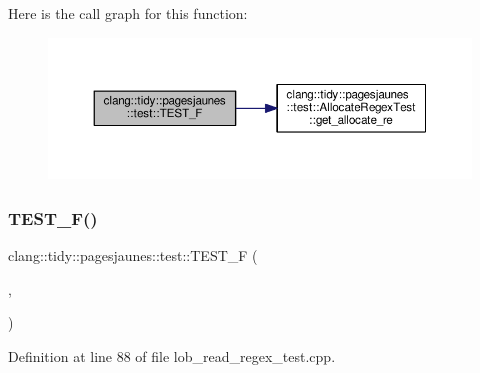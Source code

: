 Here is the call graph for this function\+:
\nopagebreak
\begin{figure}[H]
\begin{center}
\leavevmode
\includegraphics[width=350pt]{namespaceclang_1_1tidy_1_1pagesjaunes_1_1test_a4940df4810156915d9d7f59f88f92ec7_cgraph}
\end{center}
\end{figure}
\mbox{\label{namespaceclang_1_1tidy_1_1pagesjaunes_1_1test_add145896a766ab2e9a31ae812408d30c}} 
\subsubsection{\texorpdfstring{T\+E\+S\+T\+\_\+\+F()}{TEST\_F()}\hspace{0.1cm}{\footnotesize\ttfamily [22/57]}}
{\footnotesize\ttfamily clang\+::tidy\+::pagesjaunes\+::test\+::\+T\+E\+S\+T\+\_\+F (\begin{DoxyParamCaption}\item[{\hyperlink{classclang_1_1tidy_1_1pagesjaunes_1_1test_1_1_lob_read_regex_test}{Lob\+Read\+Regex\+Test}}]{,  }\item[{Regex\+Matching\+Weird\+Syntax}]{ }\end{DoxyParamCaption})}



Definition at line 88 of file lob\+\_\+read\+\_\+regex\+\_\+test.\+cpp.

